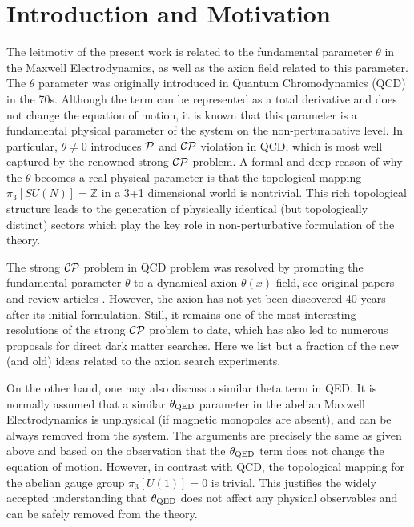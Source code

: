 \documentclass[ twocolumn,aps,prd,   
               preprintnumbers,numbers,sort&compress,nofootinbib,
                            showpacs,superscriptaddress,
               colorlinks,
               linkcolor=blue,   
               citecolor=blue]{revtex4-1}   \newcommand{\exclude}[1]{}
\begin{document}
\section{Introduction and Motivation}\label{introduction}
The leitmotiv of the present work is related to the fundamental parameter $\theta$ in the Maxwell Electrodynamics, as well as the axion field related to this parameter. The $\theta$ parameter was originally introduced in Quantum Chromodynamics (QCD) in the 70s. Although the term can be represented as a total derivative and does not change the equation of motion, it is known that this parameter is a fundamental physical parameter of the system on the non-perturabative level. In particular, $\theta\neq 0$ introduces $\cal{P}$ and $\cal{CP}$ violation in QCD, which is most well captured by the renowned strong $\cal{CP}$ problem.  A formal and deep reason of  why  the $\theta$   becomes  a real physical parameter 
is that the topological mapping  $\pi_3[SU(N)]=\mathbb{Z}$  in a 3+1 dimensional  world   is nontrivial. This rich  topological structure    leads to the generation of physically identical (but topologically distinct)   sectors which play the key  role  in non-perturbative  formulation of the  theory. 
 
  The strong $\cal{CP}$ problem in  QCD problem was resolved by promoting the fundamental parameter $\theta$ to a dynamical axion $\theta(x)$ field, see original papers \cite{axion1, axion2, axion3, KSVZ1, KSVZ2, DFSZ1, DFSZ2} and   review articles \cite{vanBibber:2006rb,Asztalos:2006kz,Raffelt:2006cw,Sikivie:2009fv,Rosenberg:2015kxa,Graham:2015ouw}. However, the axion has not yet been discovered 40 years after its initial formulation. Still, it remains one of the most interesting resolutions of the  strong $\cal{CP}$ problem to date, which has also led to numerous proposals for direct dark matter searches. Here we list but a fraction of the new (and old) ideas \cite{Budker:2013hfa,Graham:2013gfa,Rybka:2014cya,Sikivie:2013laa,Beck,Stadnik:2013raa,Sikivie:2014lha,McAllister:2015zcz,Hill:2015kva,Hill:2015vma,Kahn:2016aff,Barbieri:2016vwg, Arvanitaki:2014dfa} related to the axion search experiments. 
  
  
On the other hand, one may also discuss a similar theta term in QED. It is normally assumed that a similar   $\theta_{\rm QED}$ parameter in the abelian Maxwell Electrodynamics is unphysical (if magnetic monopoles are absent), and can be always  
removed from the system. The arguments are precisely the same as given above and based on the observation that the $\theta_{\rm QED}$ term does not change the equation of motion. However, in contrast with QCD, the  topological mapping  for the abelian gauge group $\pi_3[U(1)]=0$ is trivial. This justifies the widely accepted understanding that $\theta_{\rm QED}$ does not affect any physical observables and can be safely removed from the theory.
\end{document}
